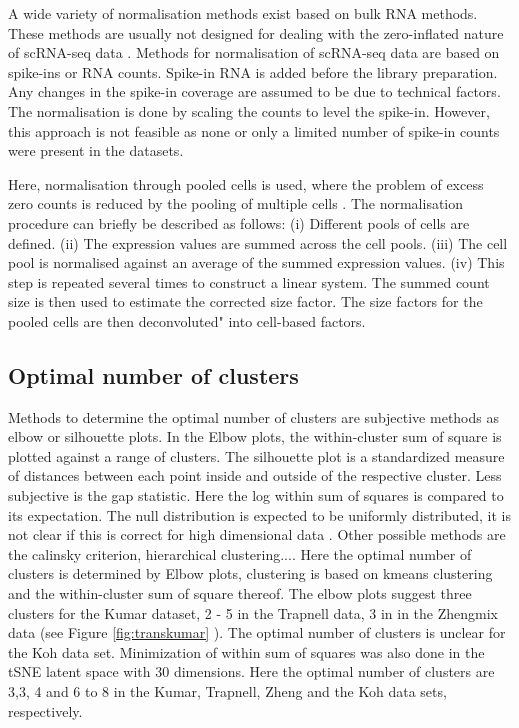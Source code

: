 \documentclass[12pt, a4paper]{article}\usepackage[]{graphicx}\usepackage[]{color}
\begin{document}
A wide variety of normalisation methods exist based on bulk RNA methods. These methods are usually not designed for dealing with the zero-inflated nature of scRNA-seq data \citep{lun2016pooling}. 
Methods for normalisation of scRNA-seq data are based on spike-ins or RNA counts. Spike-in RNA is added before the library preparation. Any changes in the spike-in coverage are assumed to be due to technical factors. The normalisation is done by scaling the counts to level the spike-in. However, this approach is not feasible as none or only a limited number of spike-in counts were present in the datasets.

Here, normalisation through pooled cells is used, where the problem of excess zero counts is reduced by the pooling of multiple cells \citep{lun2016pooling}. The normalisation procedure can briefly be described as follows: (i) Different pools of cells are defined. (ii) The expression values are summed across the cell pools. (iii) The cell pool is normalised against an average of the summed expression values. (iv) This step is repeated several times to construct a linear system. 
The summed count size is then used to estimate the corrected size factor. The size factors for the pooled cells are then deconvoluted" into cell-based factors. 

\subsection{Optimal number of clusters}
Methods to determine the optimal number of clusters are subjective methods as elbow or silhouette plots. In the Elbow plots, the within-cluster sum of square is plotted against a range of clusters. The silhouette plot is a standardized measure of distances between each point inside and outside of the respective cluster. Less subjective is the gap statistic. Here the log within sum of squares is compared to its expectation. The null distribution is expected to be uniformly distributed, it is not clear if this is correct for high dimensional data \citep{tibshirani2001estimating}. Other possible methods are the calinsky criterion, hierarchical clustering....
Here the optimal number of clusters is determined by Elbow plots, clustering is based on kmeans clustering and the within-cluster sum of square thereof.
The elbow plots suggest three clusters for the Kumar dataset, 2 - 5 in the Trapnell data, 3 in in the Zhengmix data (see Figure \ref{fig:transkumar} ). The optimal number of clusters is unclear for the Koh data set. 
Minimization of within sum of squares was also done in the tSNE latent space with 30 dimensions. Here the optimal number of clusters are 3,3, 4 and 6 to 8  in the Kumar, Trapnell, Zheng and the Koh data sets, respectively.
\end{document}
